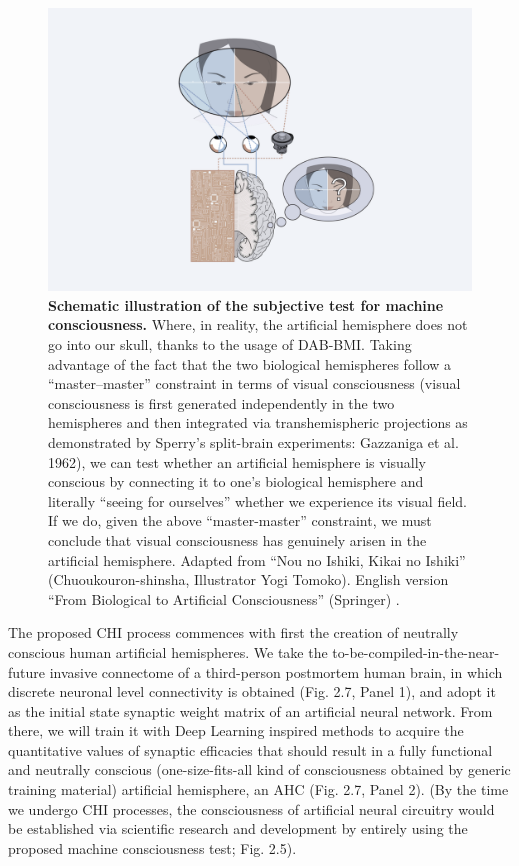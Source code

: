 \documentclass[10pt]{article}
\begin{document}
\begin{sloppypar}
  \begin{figure}[ht!]
    \centering
    \includegraphics[width=\textwidth]{figures/masa-approach-2.png}
    \caption[CHI: Schematic illustration of the subjective test for machine consciousness]{\textbf{Schematic illustration of the subjective test for machine consciousness.} Where, in reality, the artificial hemisphere does not go into our skull, thanks to the usage of DAB-BMI. Taking advantage of the fact that the two biological hemispheres follow a “master–master” constraint in terms of visual consciousness (visual consciousness is first generated independently in the two hemispheres and then integrated via transhemispheric projections as demonstrated by Sperry’s split-brain experiments: Gazzaniga et al. 1962), we can test whether an artificial hemisphere is visually conscious by connecting it to one’s biological hemisphere and literally “seeing for ourselves” whether we experience its visual field. If we do, given the above “master-master” constraint, we must conclude that visual consciousness has genuinely arisen in the artificial hemisphere. Adapted from “Nou no Ishiki, Kikai no Ishiki” (Chuoukouron-shinsha, Illustrator Yogi Tomoko). English version “From Biological to Artificial Consciousness” (Springer) \citep{watanabe_biological_2022}.}
    \label{fig:masa-approach-2}
  \end{figure}

  The proposed CHI process commences with first the creation of neutrally conscious human artificial hemispheres. We take the to-be-compiled-in-the-near-future invasive connectome of a third-person postmortem human brain, in which discrete neuronal level connectivity is obtained (Fig. 2.7, Panel 1), and adopt it as the initial state synaptic weight matrix of an artificial neural network. From there, we will train it with Deep Learning inspired methods to acquire the quantitative values of synaptic efficacies that should result in a fully functional and neutrally conscious (one-size-fits-all kind of consciousness obtained by generic training material) artificial hemisphere, an AHC (Fig. 2.7, Panel 2). (By the time we undergo CHI processes, the consciousness of artificial neural circuitry would be established via scientific research and development by entirely using the proposed machine consciousness test; Fig. 2.5).


\end{sloppypar}
\end{document}
